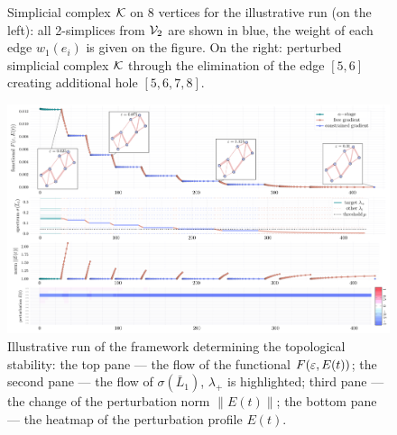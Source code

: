 \begin{figure}[t]
{}
    \caption{
    Simplicial complex $\mathcal{K}$ on $8$ vertices for the illustrative run (on the left): all 2-simplices from $\mathcal{V}_2$ are shown in blue, the weight of each edge $w_1(e_i)$ is given on the figure. On the right: perturbed simplicial complex $\mathcal{K}$ through the elimination of the edge $[5,6]$ creating additional hole $[5, 6, 7, 8]$.
    \label{fig:illustrative_start}
    }
\end{figure}


\begin{figure}[t]
    \centering
    \includegraphics[width=1.0\textwidth,clip,trim=8pt 7pt 8pt 5pt]{figures/julia/test2.pdf}
    
    \caption{Illustrative run of the framework determining the topological stability: the top pane --- the flow of the functional $F(\varepsilon, E(t))$; the second pane --- the flow of $\sigma(\bar L_1)$, $\lambda_+$ is highlighted; third pane --- the change of the perturbation norm $\| E(t) \|$; the bottom pane --- the heatmap of the perturbation profile $E(t)$.
     \label{fig:illustrative}
    }
\end{figure}

